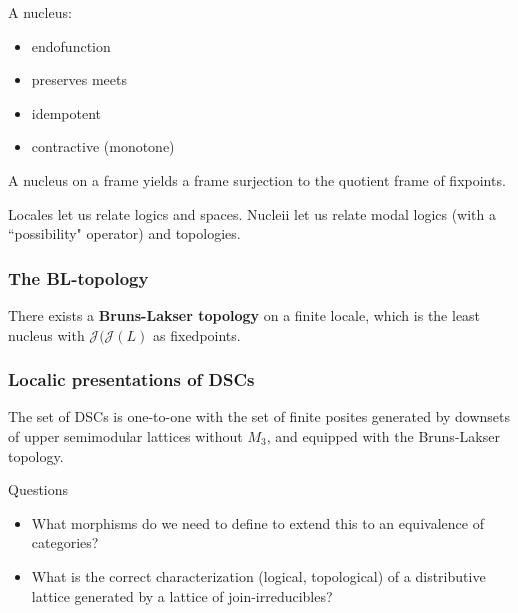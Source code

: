 \documentclass{beamer}
\newcommand{\Jc}{\mathcal{J}}
\begin{document}
\begin{frame}
A nucleus:
\begin{itemize}
\item endofunction
\item preserves meets
\item idempotent
\item contractive (monotone)
\end{itemize}

A nucleus on a frame yields a frame surjection to the quotient frame of fixpoints.
\end{frame}

\begin{frame}
Locales let us relate logics and spaces. Nucleii let us relate modal logics (with a ``possibility" operator) and topologies.
\end{frame}

\begin{frame}
\frametitle{The BL-topology}
\begin{lemma}
There exists a \textbf{Bruns-Lakser topology} on a finite locale, which is the least nucleus with \(\Jc(\Jc(L)\) as fixedpoints.
\end{lemma}

\end{frame}



\begin{frame}
\frametitle{Localic presentations of DSCs}

\begin{theorem}
The set of DSCs is one-to-one with the set of finite posites generated by downsets of upper semimodular lattices without \(M_3\), and equipped with the Bruns-Lakser topology.
\end{theorem}

Questions
\begin{itemize}
\item What morphisms do we need to define to extend this to an equivalence of categories?
\item What is the correct characterization (logical, topological) of a distributive lattice generated by a lattice of join-irreducibles?
\end{itemize}

\end{frame}
\end{document}
